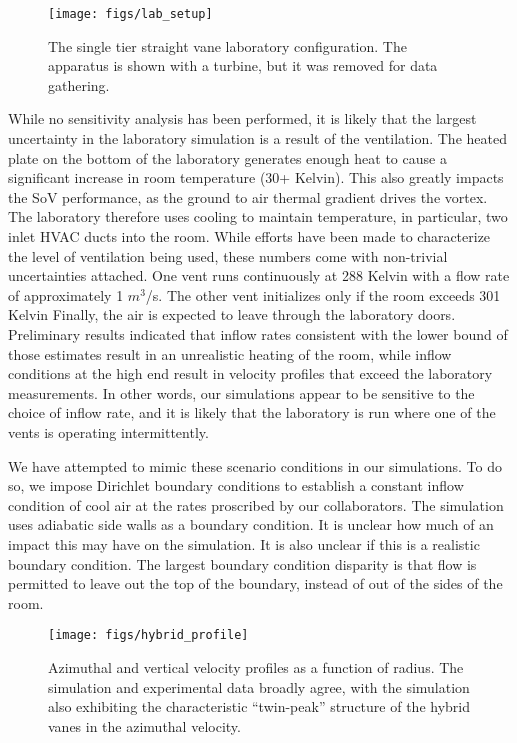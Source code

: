   \begin{figure}[!htb]
    \begin{center}
     \texttt{[image: figs/lab\_setup]}
     \caption{The single tier straight vane laboratory configuration. The
     apparatus is shown with a turbine, but it was removed for data
     gathering.}
     \label{fig:lab_image}
    \end{center}
  \end{figure}

While no sensitivity analysis has been performed, it is likely that the
largest uncertainty in the laboratory simulation is a result of the
ventilation. The heated plate on the bottom of the laboratory
generates enough heat to cause a significant increase in room
temperature (30+ Kelvin). This also greatly impacts the SoV
performance, as the ground to air thermal gradient drives the
vortex. The laboratory therefore uses cooling to maintain
temperature, in particular, two inlet HVAC ducts into the room. While
efforts have been made to characterize the level of ventilation being
used, these numbers come with non-trivial uncertainties attached. One
vent runs continuously at 288 Kelvin with a flow rate of approximately 1 
$m^3$/s.
The other vent initializes only if the room exceeds 301 Kelvin
Finally, the air is expected to leave through the laboratory doors.
Preliminary results indicated that 
inflow rates consistent with the lower bound of those estimates result in an
unrealistic heating of the room, while inflow conditions at the high end
result in velocity profiles that exceed the laboratory measurements. In
other words, our simulations appear to be sensitive to the choice of
inflow rate, and it is likely that the laboratory is run where one of
the vents is operating intermittently. 

We have attempted to mimic these scenario conditions in our
simulations. To do so, we impose Dirichlet boundary conditions to
establish a constant inflow condition of cool air at the rates 
proscribed by our collaborators. The simulation uses adiabatic side
walls as a boundary condition. It is unclear how much of an impact this
may have on the simulation. It is also unclear if this is a realistic
boundary condition. The largest boundary condition disparity is that
flow is permitted to leave out the top of the boundary, instead of out
of the sides of the room. 

  \begin{figure}[!htb]
    \begin{center}
     \texttt{[image: figs/hybrid\_profile]}
     \caption{Azimuthal and vertical velocity profiles as a function of
     radius. The simulation and experimental data broadly agree, with
     the simulation also exhibiting the characteristic ``twin-peak''
     structure of the hybrid vanes in the azimuthal velocity. }
     \label{fig:lab}
    \end{center}
  \end{figure}

